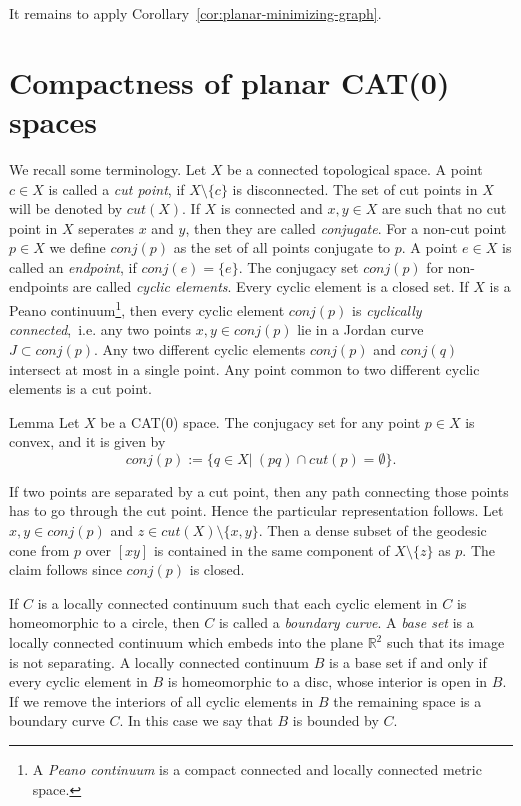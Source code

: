 \documentclass[a4paper,10pt]{amsart}
\begin{document}
It remains to apply Corollary~\ref{cor:planar-minimizing-graph}.
\qeds

\section{Compactness of planar CAT(0) spaces}

We recall some terminology. Let $X$ be a connected topological space. A point $c\in X$
is called a {\em cut point}, if $X\setminus \{c\}$ is disconnected. The set of cut points in $X$ 
will be denoted by $cut(X)$. If $X$ is connected and $x,y\in X$ are such that no cut point in $X$
seperates $x$ and $y$, then they are called {\em conjugate}. For a non-cut point $p\in X$
we define $conj(p)$ as the set of all points conjugate to $p$. A point $e\in X$ is called an {\em endpoint},
if $conj(e)=\{e\}$. The conjugacy set $conj(p)$ for non-endpoints
are called {\em cyclic elements}. Every cyclic element is a closed set\cite[IV(1.4)]{W2}. If $X$ is a 
Peano continuum\footnote{A {\em Peano continuum} is a compact
connected and locally connected metric space.}, then every cyclic element $conj(p)$ is {\em cyclically connected},\ i.e.
any two points $x,y\in conj(p)$ lie in a Jordan curve $J\subset conj(p)$\cite[III(3.32)]{Wi}. Any two different 
cyclic elements $conj(p)$ and $conj(q)$ intersect at most in a single point. Any point common to two 
different cyclic elements is a cut point\cite[IV(1.4)]{W2}.

\begin{thm}{Lemma}
 Let $X$ be a CAT(0) space. The conjugacy set for any point $p\in X$ is convex, and it is given by
 $$
conj(p):=\{q\in X|\ (pq)\cap cut(p)=\emptyset \}.
$$
\end{thm}

If two points are separated by a cut point, then any path connecting those points has to go through the cut point.
Hence the particular representation follows. Let $x,y\in conj(p)$ and $z\in cut(X)\setminus\{x,y\}$. Then a dense subset
of the geodesic cone from $p$ over $[xy]$ is contained in the same component of $X\setminus \{z\}$ as $p$. 
The claim follows since $conj(p)$ is closed.
\qeds

If $C$ is a locally connected continuum such that 
each cyclic element in $C$ is homeomorphic to a circle, then $C$ is
called a {\em boundary curve}. A {\em base set} is a locally connected continuum which
embeds into the plane $\mathbb{R}^2$ such that its image is not separating. A locally connected
continuum $B$ is a base set if and only if every cyclic element in $B$ is homeomorphic to a disc,
whose interior is open in $B$. If we remove the interiors of all cyclic elements in $B$ the remaining
space is a boundary curve $C$. In this case we say that $B$ is bounded by $C$.
\end{document}
